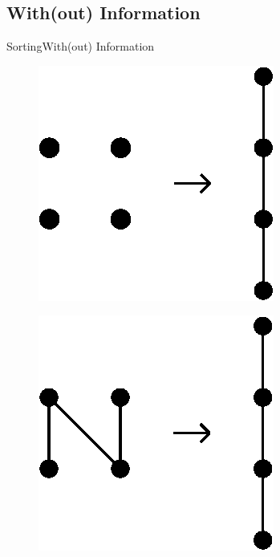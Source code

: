 

\subsection{With(out) Information}
\begin{frame}[c]{Sorting}{With(out) Information}
\begin{figure}
\centering
\begin{minipage}{.5\textwidth}
  \centering
  \includegraphics[width=.4\linewidth]{fig/without}
  \label{fig:without}
\end{minipage}%
\begin{minipage}{.5\textwidth}
  \centering
  \includegraphics[width=.4\linewidth]{fig/with}
  \label{fig:with}
\end{minipage}
\end{figure}
\end{frame}